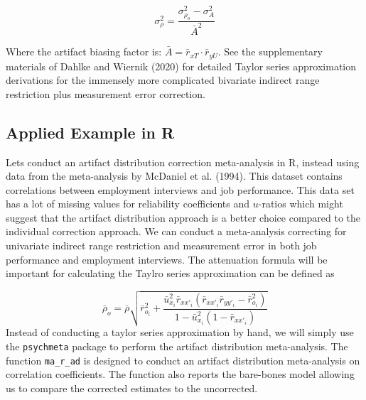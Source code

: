 \documentclass[
  letterpaper,
  DIV=11,
  numbers=noendperiod]{scrreprt}
\begin{document}
\[
\sigma_\rho^2= \frac{\sigma^2_{\rho_o} - \sigma^2_A}{\bar{A}^2}
\]

Where the artifact biasing factor is:
\(\bar{A}=\bar{r}_{xT}\cdot \bar{r}_{yU}\). See the supplementary
materials of Dahlke and Wiernik (2020) for detailed Taylor series
approximation derivations for the immensely more complicated bivariate
indirect range restriction plus measurement error correction.

\subsection{Applied Example in R}\label{applied-example-in-r-17}

Lets conduct an artifact distribution correction meta-analysis in R,
instead using data from the meta-analysis by McDaniel et al. (1994).
This dataset contains correlations between employment interviews and job
performance. This data set has a lot of missing values for reliability
coefficients and \(u\)-ratios which might suggest that the artifact
distribution approach is a better choice compared to the individual
correction approach. We can conduct a meta-analysis correcting for
univariate indirect range restriction and measurement error in both job
performance and employment interviews. The attenuation formula will be
important for calculating the Taylro series approximation can be defined
as

\[
\bar{\rho}_o=\bar{\rho}\sqrt{\bar{r}_{o_i}^2 + \frac{\bar{u}_{x_i}^2 \bar{r}_{xx'_i}(\bar{r}_{xx'_i}\bar{r}_{yy'_i} - \bar{r}_{o_i}^2) }{1 - \bar{u}_{x_i}^2 (1-\bar{r}_{xx'_i})} }
\] Instead of conducting a taylor series approximation by hand, we will
simply use the \texttt{psychmeta} package to perform the artifact
distribution meta-analysis. The function \texttt{ma\_r\_ad} is designed
to conduct an artifact distribution meta-analysis on correlation
coefficients. The function also reports the bare-bones model allowing us
to compare the corrected estimates to the uncorrected.
\end{document}
